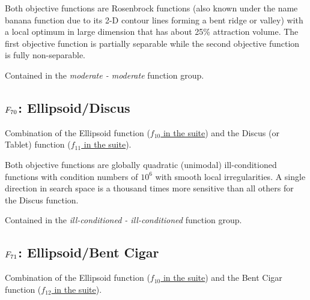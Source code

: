 Both objective functions are Rosenbrock functions (also known under the name
banana function due to its 2-D contour lines forming a bent ridge or valley)
with a local optimum in large dimension that has about 25\% attraction volume.
The first objective function is partially separable while the second objective
function is fully non-separable.

Contained in the \emph{moderate - moderate} function group.



\subsection[\texorpdfstring{\protect\(F_{70}\protect\): Ellipsoid/Discus}{F70: Ellipsoid/Discus}]{\texorpdfstring{\protect\(F_{70}\protect\): Ellipsoid/Discus}{}}
\label{index:ellipsoid-discus}\label{index:f70}
Combination of the Ellipsoid function (\href{https://coco.gforge.inria.fr/downloads/download16.00/bbobdocfunctions.pdf\#page=50}{\(f_{10}\) in the \bbob suite}) and the
Discus (or Tablet) function (\href{https://coco.gforge.inria.fr/downloads/download16.00/bbobdocfunctions.pdf\#page=55}{\(f_{11}\) in the \bbob suite}).

Both objective functions are globally quadratic (unimodal) ill-conditioned functions with
condition numbers of \(10^6\) with  smooth local irregularities. A single direction
in search space is a thousand times more sensitive than all others for the Discus function.

Contained in the \emph{ill-conditioned - ill-conditioned} function group.



\subsection[\texorpdfstring{\protect\(F_{71}\protect\): Ellipsoid/Bent Cigar}{F71: Ellipsoid/Bent Cigar}]{\texorpdfstring{\protect\(F_{71}\protect\): Ellipsoid/Bent Cigar}{}}
\label{index:ellipsoid-bent-cigar}\label{index:f71}
Combination of the Ellipsoid function (\href{https://coco.gforge.inria.fr/downloads/download16.00/bbobdocfunctions.pdf\#page=50}{\(f_{10}\) in the \bbob suite}) and the
Bent Cigar function (\href{https://coco.gforge.inria.fr/downloads/download16.00/bbobdocfunctions.pdf\#page=60}{\(f_{12}\) in the \bbob suite}).

